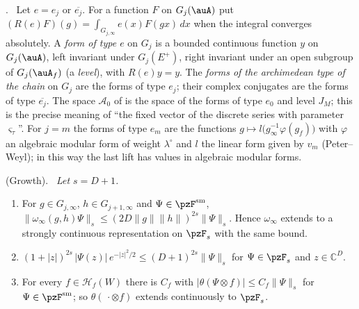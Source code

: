 \documentclass[10pt]{amsart}
\theoremstyle{definition}
\theoremstyle{remark}
\newcommand{\C}{\mathbb C}
\providecommand{\auAz}{\mathcal A_0}
\providecommand{\psHS}{\mathcal H}
\newenvironment{quotedthm}[2]{\par\medskip\noindent\begingroup
  \textbf{#1}#2.\ \itshape\ignorespaces}{\endgroup\par\medskip}
\newenvironment{quoteddef}[2]{\par\medskip\noindent\begingroup
  \textbf{#1}#2.\ \ignorespaces}{\endgroup\par\medskip}
\begin{document}
\begin{quoteddef}{\cite[Definition~8.1]{P49}}{}
Let $e=e_j$ or $\overline{e_j}$. For a function $F$ on $G_j(\auA)$ put $(R(e)F)(g)=
\int_{G_{j,\infty}}e(x)F(gx)\,dx$ when the integral converges absolutely. A \emph{form of type $e$}
on $G_j$ is a bounded continuous function $y$ on $G_j(\auA)$, left invariant under $G_j(E^+)$, right
invariant under an open subgroup of $G_j(\auA_f)$ (a \emph{level}), with $R(e)y=y$. The
\emph{forms of the archimedean type of the chain} on $G_j$ are the forms of type $e_j$; their
complex conjugates are the forms of type $\overline{e_j}$. The space $\auAz$ of
{\cite[\S14.3]{P46}} is the space of the forms of type $e_0$ and level $J_M$; this is the precise
meaning of ``the fixed vector of the discrete series with parameter $\varsigma_\tau$''. For $j=m$
the forms of type $e_m$ are the functions $g\mapsto l\bigl(g_\infty^{-1}\varphi(g_f)\bigr)$ with
$\varphi$ an algebraic modular form of weight $\lambda^\circ$ and $l$ the linear form given by
$v_m$ (Peter--Weyl); in this way the last lift has values in algebraic modular forms.
\end{quoteddef}

\begin{quotedthm}{\cite[Lemma~8.2]{P49}}{ (Growth)}
Let $s=D+1$.
\begin{enumerate}
\item[(a)] For $g\in G_{j,\infty}$, $h\in G_{j+1,\infty}$ and $\Psi\in\pzF^{\mathrm{sm}}$,
$\|\omega_\infty(g,h)\Psi\|_s\le(2D\|g\|\|h\|)^{2s}\|\Psi\|_s$. Hence $\omega_\infty$ extends to a
strongly continuous representation on $\pzF_s$ with the same bound.
\item[(b)] $(1+|z|)^{2s}\,|\Psi(z)|\,e^{-|z|^2/2}\le(D+1)^{2s}\|\Psi\|_s$ for $\Psi\in\pzF_s$ and
$z\in\C^D$.
\item[(c)] For every $f\in\psHS_f(W)$ there is $C_f$ with $|\theta(\Psi\otimes f)|\le C_f\|\Psi\|_s$
for $\Psi\in\pzF^{\mathrm{sm}}$; so $\theta(\,\cdot\otimes f)$ extends continuously to $\pzF_s$.
\end{enumerate}
\end{quotedthm}
\end{document}
